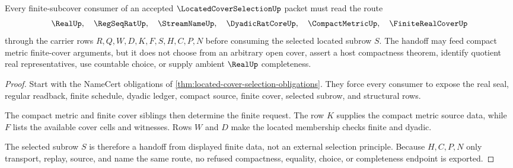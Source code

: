 \begin{theorem}
\label{thm:located-cover-selection-finite-subcover-handoff}
Every finite-subcover consumer of an accepted $\LocatedCoverSelectionUp$ packet must read the route
$$
\RealUp,\quad \RegSeqRatUp,\quad \StreamNameUp,\quad \DyadicRatCoreUp,\quad \CompactMetricUp,\quad \FiniteRealCoverUp
$$
through the carrier rows $R,Q,W,D,K,F,S,H,C,P,N$ before consuming the selected located subrow $S$. The handoff may feed compact metric finite-cover arguments, but it does not choose from an arbitrary open cover, assert a host compactness theorem, identify quotient real representatives, use countable choice, or supply ambient $\RealUp$ completeness.
\end{theorem}
\begin{proof}
Start with the NameCert obligations of \autoref{thm:located-cover-selection-obligations}. They force every consumer to expose the real seal, regular readback, finite schedule, dyadic ledger, compact source, finite cover, selected subrow, and structural rows.

The compact metric and finite cover siblings then determine the finite request. The row $K$ supplies the compact metric source data, while $F$ lists the available cover cells and witnesses. Rows $W$ and $D$ make the located membership checks finite and dyadic.

The selected subrow $S$ is therefore a handoff from displayed finite data, not an external selection principle. Because $H,C,P,N$ only transport, replay, source, and name the same route, no refused compactness, equality, choice, or completeness endpoint is exported.
\end{proof}




